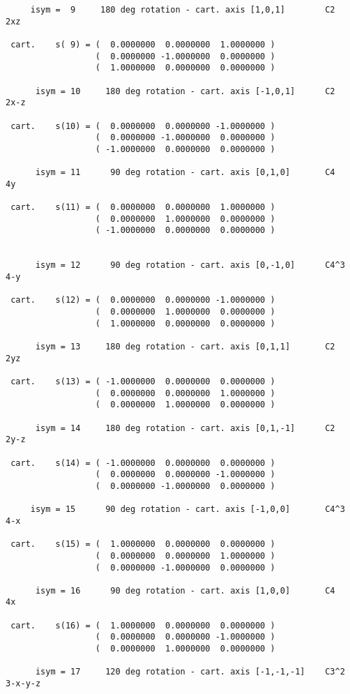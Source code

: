 \documentclass[12pt,a4paper,twoside]{report}
\begin{document}
\begin{tcolorbox}
\begin{scriptsize}
\begin{verbatim}
     isym =  9     180 deg rotation - cart. axis [1,0,1]        C2    2xz

 cart.    s( 9) = (  0.0000000  0.0000000  1.0000000 )
                  (  0.0000000 -1.0000000  0.0000000 )
                  (  1.0000000  0.0000000  0.0000000 )

      isym = 10     180 deg rotation - cart. axis [-1,0,1]      C2    2x-z

 cart.    s(10) = (  0.0000000  0.0000000 -1.0000000 )
                  (  0.0000000 -1.0000000  0.0000000 )
                  ( -1.0000000  0.0000000  0.0000000 )

      isym = 11      90 deg rotation - cart. axis [0,1,0]       C4    4y

 cart.    s(11) = (  0.0000000  0.0000000  1.0000000 )
                  (  0.0000000  1.0000000  0.0000000 )
                  ( -1.0000000  0.0000000  0.0000000 )


      isym = 12      90 deg rotation - cart. axis [0,-1,0]      C4^3   4-y

 cart.    s(12) = (  0.0000000  0.0000000 -1.0000000 )
                  (  0.0000000  1.0000000  0.0000000 )
                  (  1.0000000  0.0000000  0.0000000 )

      isym = 13     180 deg rotation - cart. axis [0,1,1]       C2     2yz

 cart.    s(13) = ( -1.0000000  0.0000000  0.0000000 )
                  (  0.0000000  0.0000000  1.0000000 )
                  (  0.0000000  1.0000000  0.0000000 )

      isym = 14     180 deg rotation - cart. axis [0,1,-1]      C2     2y-z

 cart.    s(14) = ( -1.0000000  0.0000000  0.0000000 )
                  (  0.0000000  0.0000000 -1.0000000 )
                  (  0.0000000 -1.0000000  0.0000000 )

     isym = 15      90 deg rotation - cart. axis [-1,0,0]       C4^3   4-x

 cart.    s(15) = (  1.0000000  0.0000000  0.0000000 )
                  (  0.0000000  0.0000000  1.0000000 )
                  (  0.0000000 -1.0000000  0.0000000 )

      isym = 16      90 deg rotation - cart. axis [1,0,0]       C4     4x

 cart.    s(16) = (  1.0000000  0.0000000  0.0000000 )
                  (  0.0000000  0.0000000 -1.0000000 )
                  (  0.0000000  1.0000000  0.0000000 )

      isym = 17     120 deg rotation - cart. axis [-1,-1,-1]    C3^2   3-x-y-z


\end{verbatim}
\end{scriptsize}
\end{tcolorbox}
\end{document}
